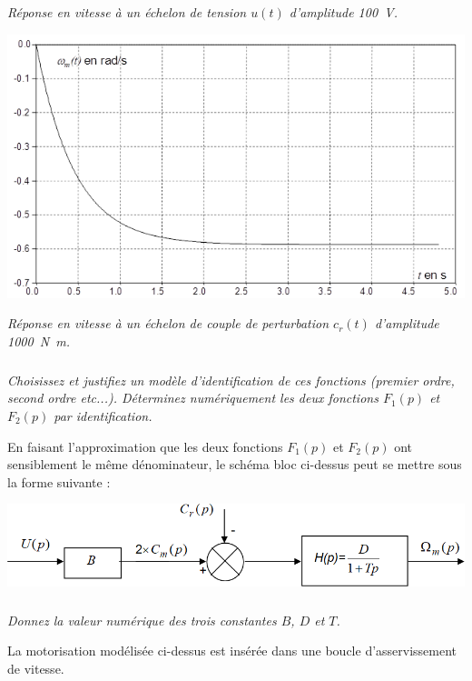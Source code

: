 \documentclass[10pt,fleqn]{article} %
\begin{document}
\begin{multicols}{2}
\begin{center}
\textit{Réponse en vitesse à un échelon de tension $u(t)$ d’amplitude \SI{100}{V}.}
\end{center}

\begin{center}
\includegraphics[width=\linewidth]{images2/fig_06_b}

\textit{Réponse en vitesse à un échelon de couple de perturbation $c_r(t)$ d’amplitude \SI{1000}{N.m}.}
\end{center}



\subparagraph{}
\textit{Choisissez et justifiez un modèle d’identification de ces fonctions (premier ordre, second ordre etc...). Déterminez numériquement les deux fonctions $F_1(p)$ et $F_2(p)$ par identification.}


En faisant l’approximation que les deux fonctions $F_1(p)$ et $F_2(p)$ ont sensiblement le même dénominateur, le schéma bloc ci-dessus peut se mettre sous la forme suivante :
\begin{center}
	\includegraphics[width=\linewidth]{images2/fig_03}
\end{center}


\subparagraph{}
\textit{Donnez la valeur numérique des trois constantes $B$, $D$ et $T$.}

La motorisation modélisée ci-dessus est insérée dans une boucle d’asservissement de vitesse.


\end{multicols}
\end{document}
